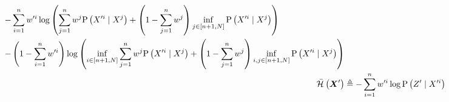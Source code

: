 \begin{lemma}
\begin{small}
\begin{subequations}
\begin{align}
\begin{split}
				&\phantomeq-\sum_{i=1}^n\weight{}{\prime i}\log\left(\sum_{j=1}^n\weight{}{j}\probcond{\states{}^{\prime i}}{\states{}^j}+\left(1-\sum\limits_{j=1}^n\weight{}{j}\right)\inf_{j\in[n+1,N]}\probcond{\states{}^{\prime i}}{\states{}^j}\right)\\
				& \phantomeq-\left(1-\sum_{i=1}^n\weight{}{\prime i}\right)\log\left(\inf_{i\in[n+1,N]}\sum_{j=1}^n\weight{}{j}\probcond{\states{}^{\prime i}}{\states{}^j}+\left(1-\sum\limits_{j=1}^n\weight{}{j}\right)\inf_{i,j\in[n+1,N]}\probcond{\states{}^{\prime i}}{\states{}^j}\right)
			\end{split}\\
			\simplentropy{\statesRV{}^\prime}{} & \triangleq-\sum_{i=1}^n\weight{}{\prime i}\log\probcond{\observations{}^\prime}{\states{}^{\prime i}}
		\end{align}
	\end{subequations}
	\end{small}
\end{lemma}
